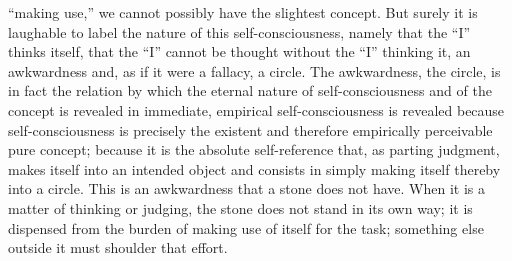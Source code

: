 “making use,” we cannot possibly have the slightest concept. But surely it is
laughable to label the nature of this self-consciousness, namely that the “I”
thinks itself, that the “I” cannot be thought without the “I” thinking it, an
awkwardness and, as if it were a fallacy, a circle. The awkwardness, the circle,
is in fact the relation by which the eternal nature of self-consciousness and
of the concept is revealed in immediate, empirical self-consciousness
 is
revealed because self-consciousness is precisely the existent and therefore
empirically perceivable pure concept; because it is the absolute self-reference
that, as parting judgment, makes itself into an intended object and consists
in simply making itself thereby into a circle.
 This is an awkwardness that
a stone does not have. When it is a matter of thinking or judging, the stone
does not stand in its own way; it is dispensed from the burden of making
use of itself for the task; something else outside it must shoulder that effort.

